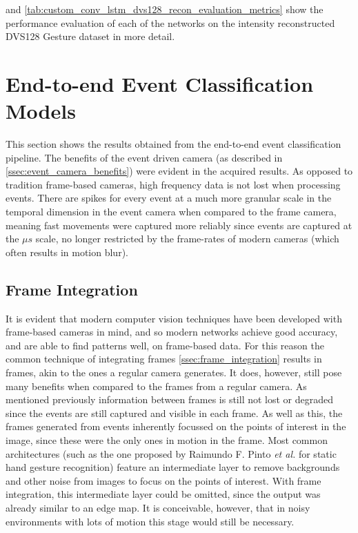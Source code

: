  and \cref{tab:custom_conv_lstm_dvs128_recon_evaluation_metrics} show the performance evaluation of each of the networks on the intensity reconstructed DVS128 Gesture dataset in more detail. 

\section{End-to-end Event Classification Models}

This section shows the results obtained from the end-to-end event classification pipeline. The benefits of the event driven camera (as described in \cref{ssec:event_camera_benefits}) were evident in the acquired results. As opposed to tradition frame-based cameras, high frequency data is not lost when processing events. There are spikes for every event at a much more granular scale in the temporal dimension in the event camera when compared to the frame camera, meaning fast movements were captured more reliably since events are captured at the $\mu s$ scale, no longer restricted by the frame-rates of modern cameras (which often results in motion blur).

\subsection{Frame Integration}

It is evident that modern computer vision techniques have been developed with frame-based cameras in mind, and so modern networks achieve good accuracy, and are able to find patterns well, on frame-based data. For this reason the common technique of integrating frames \cref{ssec:frame_integration} results in frames, akin to the ones a regular camera generates. It does, however, still pose many benefits when compared to the frames from a regular camera. As mentioned previously information between frames is still not lost or degraded since the events are still captured and visible in each frame. As well as this, the frames generated from events inherently focussed on the points of interest in the image, since these were the only ones in motion in the frame. Most common architectures (such as the one proposed by Raimundo F. Pinto \textit{et al.} for static hand gesture recognition\cite{StaticHandGesture}) feature an intermediate layer to remove backgrounds and other noise from images to focus on the points of interest. With frame integration, this intermediate layer could be omitted, since the output was already similar to an edge map. It is conceivable, however, that in noisy environments with lots of motion this stage would still be necessary.

